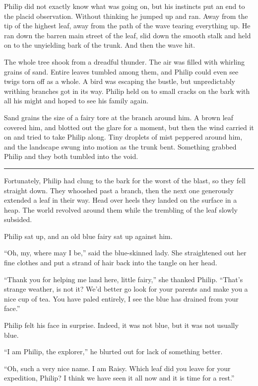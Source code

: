\documentclass[10pt, draft]{memoir}
\renewcommand{\pfbreakdisplay}{\bigskip \ding{166} \bigskip}
\newcommand{\secbreak}{\fancybreak{\pfbreakdisplay}}
\begin{document}
Philip did not exactly know what was going on, but his instincts put an end to the placid observation. Without thinking he jumped up and ran. Away from the tip of the highest leaf, away from the path of the wave tearing everything up. He ran down the barren main street of the leaf, slid down the smooth stalk and held on to the unyielding bark of the trunk. And then the wave hit.

The whole tree shook from a dreadful thunder. The air was filled with whirling grains of sand. Entire leaves tumbled among them, and Philip could even see twigs torn off as a whole. A bird was escaping the bustle, but unpredictably writhing branches got in its way. Philip held on to small cracks on the bark with all his might and hoped to see his family again.

Sand grains the size of a fairy tore at the branch around him. A brown leaf covered him, and blotted out the glare for a moment, but then the wind carried it on and tried to take Philip along. Tiny droplets of mist peppered around him, and the landscape swung into motion as the trunk bent. Something grabbed Philip and they both tumbled into the void.

\secbreak

Fortunately, Philip had clung to the bark for the worst of the blast, so they fell straight down. They whooshed past a branch, then the next one generously extended a leaf in their way. Head over heels they landed on the surface in a heap. The world revolved around them while the trembling of the leaf slowly subsided.

Philip sat up, and an old blue fairy sat up against him.

``Oh, my, where may I be,'' said the blue-skinned lady. She straightened out her fine clothes and put a strand of hair back into the tangle on her head.

``Thank you for helping me land here, little fairy,'' she thanked Philip. ``That's strange weather, is not it? We'd better go look for your parents and make you a nice cup of tea. You have paled entirely, I see the blue has drained from your face.''

Philip felt his face in surprise. Indeed, it was not blue, but it was not usually blue.

``I am Philip, the explorer,'' he blurted out for lack of something better.

``Oh, such a very nice name. I am Raisy. Which leaf did you leave for your expedition, Philip? I think we have seen it all now and it is time for a rest.''
\end{document}
